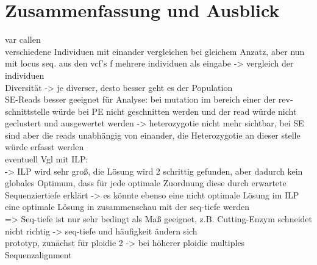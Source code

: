 \chapter{Zusammenfassung und Ausblick} \label{sec:ausblick} 
var callen\\
verschiedene Individuen mit einander vergleichen bei gleichem Anzatz, aber nun mit locus seq. aus den vcf's f mehrere individuen als eingabe -> vergleich der individuen \\
Diversität -> je diverser, desto besser geht es der Population\\
SE-Reads besser geeignet für Analyse: bei mutation im bereich einer der rev-schnittstelle  würde bei PE nicht geschnitten werden und der read würde nicht geclustert und ausgewertet werden -> heterozygotie nicht mehr sichtbar, bei SE sind aber die reads unabhängig von einander, die Heterozygotie an dieser stelle würde erfasst werden\\
eventuell Vgl mit ILP:\\
-> ILP wird sehr groß, die Lösung wird 2 schrittig gefunden, aber dadurch kein globales Optimum, dass für jede optimale Zuordnung diese durch erwartete Sequenziertiefe erklärt -> es könnte ebenso eine nicht optimale Lösung im ILP eine optimale Lösung in zusammenschau mit der seq-tiefe werden \\
=> Seq-tiefe ist nur sehr bedingt als Maß geeignet, z.B. Cutting-Enzym schneidet nicht richtig -> seq-tiefe und häufigkeit ändern sich\\

prototyp, zunächst für ploidie 2 -> bei höherer ploidie multiples Sequenzalignment ~\cite{liu_2010} ~\cite{yoon_2009} ~\cite{durbin_1998}


\section{} \label{sec:}
\subsection{} \label{subsec:}